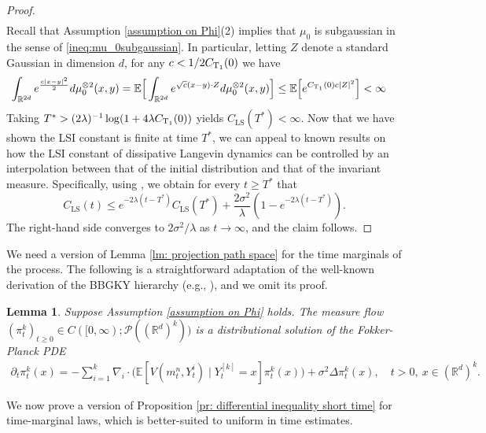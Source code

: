 \documentclass[11pt,reqno]{amsart}
\numberwithin{equation}{section}
\newtheorem{lemma}[theorem]{Lemma}
\theoremstyle{definition}
\def\E{{\mathbb E}}
\def\R{{\mathbb R}}
\begin{document}
\begin{proof}
\begin{align*}
\end{align*}
Recall that Assumption \ref{assumption on Phi}(2) implies that $\mu_0$ is subgaussian in the sense of \eqref{ineq:mu_0subgaussian}. In particular, letting $Z$ denote a standard Gaussian in dimension $d$,
for any  $c < 1/2C_{\textup{T}_1}(0)$ we have
\begin{align}
\int_{\R^{2d}} e^{\frac{c|x-y|^2}{2}}d\mu_0^{\otimes 2}(x,y) &= \E\Big[\int_{\R^{2d}} e^{ \sqrt{c} (x-y) \cdot Z}d\mu_0^{\otimes 2}(x,y)\Big] \le \E\Big[ e^{ C_{\textup{T}_1}(0) c |Z|^2}\Big] < \infty
\end{align}
Taking $T^*> (2\lambda)^{-1}\log(1+4\lambda  C_{\textup{T}_1}(0)  )$ yields  $C_{\text{LS}}(T^*)<\infty$.
Now that we have shown the LSI constant is finite at time $T^*$, we can appeal to known results on how the LSI constant of dissipative Langevin dynamics can be controlled by an interpolation between that of the initial distribution and that of the invariant measure.
Specifically, using \cite[Proposition 1.1]{TimeUniformLSI}, we obtain for every $t\geq T^*$ that
\[C_{\text{LS}}(t)\leq e^{-2\lambda (t-T^*)}C_{\text{LS}}(T^*)+ \frac{2\sigma^2}{\lambda}(1-e^{-2\lambda (t-T^*)}).\]
The right-hand side converges to $2\sigma^2/\lambda$ as $t\to\infty$, and the claim follows.
\end{proof}

We need a version of Lemma \ref{lm: projection path space} for the time marginals of the process. The following is a straightforward adaptation of the well-known derivation of the BBGKY hierarchy (e.g., \cite[Lemma 3.4]{SharpChaosLacker2023}), and we omit its proof.
\begin{lemma}
\label{lm: mimicking theorem marginal}
Suppose Assumption \ref{assumption on Phi} holds.
    The measure flow $(\pi^k_t)_{t \ge 0} \in C([0,\infty);\mathcal P((\R^d)^k))$ is a distributional solution of the Fokker-Planck PDE
    \begin{align*}
        \partial_t \pi_t^k(x)=-\sum_{i=1}^k \nabla_i \cdot \Big(\E[V(m_t^n,Y_t^i)\mid Y_t^{[k]}=x]\pi_t^k(x)\Big)+\sigma^2 \Delta \pi_t^k(x), \quad t > 0, \ x \in (\R^d)^k.
    \end{align*}
\end{lemma}
We now prove a version of Proposition \ref{pr: differential inequality short time} for time-marginal laws, which is better-suited  to uniform in time estimates.
\end{document}
